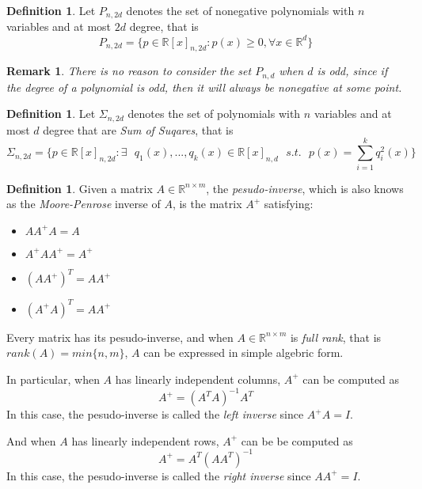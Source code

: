 \documentclass[12pt]{amsart}
\numberwithin{equation}{section}
\newtheorem{remark}[thm]{Remark}
\theoremstyle{definition}
\newtheorem{definition}[thm]{Definition}
\numberwithin{thm}{section}
\begin{document}
\begin{definition}
     Let $P_{n, 2d}$ denotes the set of nonegative polynomials with 
     $n$ variables and at most $2d$ degree, that is 
     \begin{equation}
          P_{n, 2d} = \{ p \in \mathbb{R}[x]_{n, 2d}: p(x) \geq 0, \forall x \in \mathbb{R}^d \}
     \end{equation}
\end{definition}

\begin{remark}
     There is no reason to consider the set $P_{n, d}$ when $d$ is odd, since if the 
     degree of a polynomial is odd, then it will always be nonegative at some point.
\end{remark}

\begin{definition}
     Let $\Sigma_{n,2d}$ denotes the set of polynomials with $n$ variables and at most
     $d$ degree that are \emph{Sum of Suqares}, that is
     \begin{equation}
          \Sigma_{n, 2d} = \{ p \in \mathbb{R}[x]_{n, 2d}: \exists \text{ } q_1(x), ..., q_k(x) \in \mathbb{R}[x]_{n,d} \text{ } s.t. \text{ }  p(x) = \sum_{i=1}^k q_i^2(x)\}
     \end{equation}     
\end{definition}

\begin{definition}
     Given a matrix $A \in \mathbb{R}^{n \times m}$, the \emph{pesudo-inverse},
     which is also knows as the \emph{Moore-Penrose} inverse of $A$, is the matrix
     $A^+$ satisfying:
     \begin{itemize}
          \item $A A^+ A = A$
          \item $A^+ A A^+ = A^+$
          \item $(A A^+)^T = A A^+$
          \item $(A^+ A)^T = A A^+$
        \end{itemize}
     Every matrix has its pesudo-inverse, and when $A \in \mathbb{R}^{n \times m}$ is \emph{full rank}, 
     that is $rank(A) = min\{n, m\}$, $A$ can be expressed in simple algebric form.
     
     In particular, when $A$ has linearly independent columns, $A^+$ can be computed as
     \begin{equation}
          A^+ = (A^T A)^{-1} A^T
     \end{equation}
     In this case, the pesudo-inverse is called the \emph{left inverse} since $A^+ A = I$.

     And when $A$ has linearly independent rows, $A^+$ can be be computed as
     \begin{equation}
          A^+ = A^T (A A^T)^{-1}
     \end{equation}
     In this case, the pesudo-inverse is called the \emph{right inverse} since $A A^+ = I$. 
\end{definition}
\end{document}
